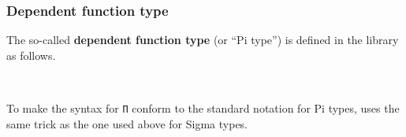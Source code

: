 \subsubsection{Dependent function type}\label{Preliminaries.sssec:dependent-function-type}
The so-called \textbf{dependent function type} (or ``Pi type'') is defined in the \typetopology library as follows.
\ccpad
\begin{code}
\>[0]\AgdaSpace{}%
\AgdaSymbol{:}\AgdaSpace{}%
\AgdaSymbol{\{}\AgdaSpace{}%
\AgdaSymbol{:}\AgdaSpace{}%
\AgdaSpace{}%
\AgdaSpace{}%
\AgdaSymbol{\}}\AgdaSpace{}%
\AgdaSymbol{(}\AgdaSpace{}%
\AgdaSymbol{:}\AgdaSpace{}%
\AgdaSpace{}%
\AgdaSpace{}%
\AgdaSpace{}%
\AgdaSpace{}%
\AgdaSymbol{)}\AgdaSpace{}%
\AgdaSpace{}%
\AgdaSpace{}%
\AgdaSpace{}%
\AgdaSpace{}%
\<%
\\
\>[0]\AgdaSpace{}%
\AgdaSymbol{\{}\AgdaSymbol{\}}\AgdaSpace{}%
\AgdaSymbol{\{}\AgdaSymbol{\}}\AgdaSpace{}%
\AgdaSymbol{\{}\AgdaSymbol{\}}\AgdaSpace{}%
\AgdaSpace{}%
\AgdaSymbol{=}\AgdaSpace{}%
\AgdaSymbol{(}\AgdaSpace{}%
\AgdaSymbol{:}\AgdaSpace{}%
\AgdaSymbol{)}\AgdaSpace{}%
\AgdaSpace{}%
\AgdaSpace{}%
\<%
\end{code}
\ccpad
To make the syntax for \texttt{Π} conform to the standard notation for Pi types, \mhe uses the same trick as the one used above for Sigma types.
\ccpad
